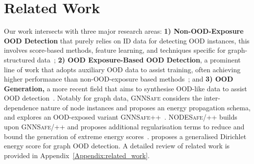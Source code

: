 \section{Related Work}
Our work intersects with three major research areas: \textbf{1) Non-OOD-Exposure OOD Detection} that purely relies on ID data for detecting OOD instances, this involves score-based methods, feature learning, and techniques specific for graph-structured data~\citep{ConfOOD, Hendrycks17softmax, MSP, GenOE, energy, SGOOD, grasp, GKDE, GOOD-D, GraphDE, GNNSafe, NODESAFE}; \textbf{2) OOD Exposure-Based OOD Detection}, a prominent line of work that adopts auxiliary OOD data to assist training, often achieving higher performance than non-OOD-exposure based methods~\citep{OE, energy, Textual-OODExposure, DivOE, ATOL, SAL,GNNSafe, GDE_OOD}; and \textbf{3) OOD Generation,} a more recent field that aims to synthesise OOD-like data to assist OOD detection~\citep{manifold, Likelihood, LRegret, GenAnalysis, GenUnknown, Hierarc,ConfOOD,VOS,NPOS}. Notably for graph data, \textsc{GNNSafe} considers the inter-dependence nature of node instances and proposes an energy propagation schema, and explores an OOD-exposed variant \textsc{GNNSafe++}~\citep{GNNSafe}. \textsc{NODESafe/++} builds upon \textsc{GNNSafe/++} and proposes additional regularisation terms to reduce and bound the generation of extreme energy scores~\citep{NODESAFE}. \cite{GDE_OOD} proposes a generalised Dirichlet energy score for graph OOD detection. A detailed review of related work is provided in Appendix~\ref{Appendix:related_work}.

